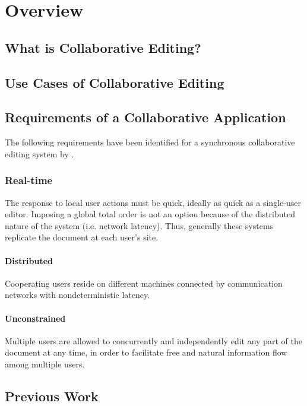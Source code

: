 \chapter{Overview}
\label{chapter:overview}



\section{What is Collaborative Editing?}



\section{Use Cases of Collaborative Editing}



\section{Requirements of a Collaborative Application}
The following requirements have been identified for a synchronous collaborative
editing system by \cite{sun98a}.

\subsection{Real-time} 
The response to local user actions must be quick, ideally
as quick as a single-user editor. Imposing a global total order is not
an option because of the distributed nature of the system (i.e. network
latency). Thus, generally these systems replicate the document at each
user's site.

\subsubsection{Distributed} 
Cooperating users reside on different machines 
connected by communication networks with nondeterministic latency.

\subsubsection{Unconstrained} 
Multiple users are allowed to concurrently and
independently edit any part of the document at any time, in order to 
facilitate free and natural information flow among multiple users.



\section{Previous Work}
\label{sect:overview.previouswork}

